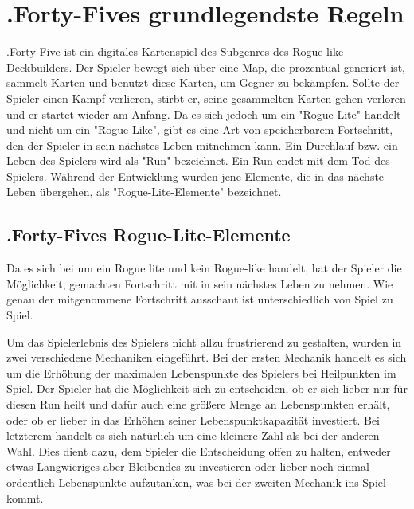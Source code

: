 
\section{.Forty-Fives grundlegendste Regeln}\label{sec:grundlegenste-regeln}

\renewcommand{\kapitelautor}{Autor: Philip Jankovic}

%
.Forty-Five ist ein digitales Kartenspiel des Subgenres des Rogue-like Deckbuilders. %
Der Spieler bewegt sich über eine Map, die prozentual generiert ist, sammelt Karten und benutzt diese Karten,
um Gegner zu bekämpfen. Sollte der Spieler einen Kampf verlieren, stirbt er, seine gesammelten Karten
gehen verloren und er startet wieder am Anfang. Da es sich jedoch um ein "Rogue-Lite" handelt und nicht um ein "Rogue-Like",
gibt es eine Art von speicherbarem Fortschritt, den der Spieler in sein nächstes Leben mitnehmen kann.
Ein Durchlauf bzw. ein Leben des Spielers wird als "Run" bezeichnet. Ein Run endet mit dem Tod des Spielers.
Während der Entwicklung wurden jene Elemente, die in das nächste Leben übergehen, als "Rogue-Lite-Elemente" bezeichnet.



\subsection{.Forty-Fives Rogue-Lite-Elemente}\label{rogue_lite_elemente}

Da es sich bei \FF um ein Rogue lite und kein Rogue-like handelt, hat der Spieler die Möglichkeit, gemachten Fortschritt mit in sein nächstes Leben zu nehmen.
Wie genau der mitgenommene Fortschritt ausschaut ist unterschiedlich von Spiel zu Spiel.


Um das Spielerlebnis des Spielers nicht allzu frustrierend zu gestalten, wurden in \FF zwei verschiedene Mechaniken eingeführt.
Bei der ersten Mechanik handelt es sich um die Erhöhung der maximalen Lebenspunkte des Spielers bei Heilpunkten im Spiel. Der Spieler hat die Möglichkeit
sich zu entscheiden, ob er sich lieber nur für diesen Run heilt und dafür auch eine größere Menge an Lebenspunkten erhält, oder ob er
lieber in das Erhöhen seiner Lebenspunktkapazität investiert. Bei letzterem handelt es sich natürlich um eine kleinere Zahl als bei der anderen Wahl.
Dies dient dazu, dem Spieler die Entscheidung offen zu halten, entweder etwas Langwieriges aber Bleibendes zu investieren oder lieber noch einmal ordentlich
Lebenspunkte aufzutanken, was bei der zweiten Mechanik ins Spiel kommt.

